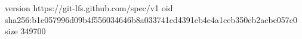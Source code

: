 version https://git-lfs.github.com/spec/v1
oid sha256:b1e057996d09b4f556034646b8a033741cd4391eb4e4a1ceb350eb2aebe057c0
size 349700
